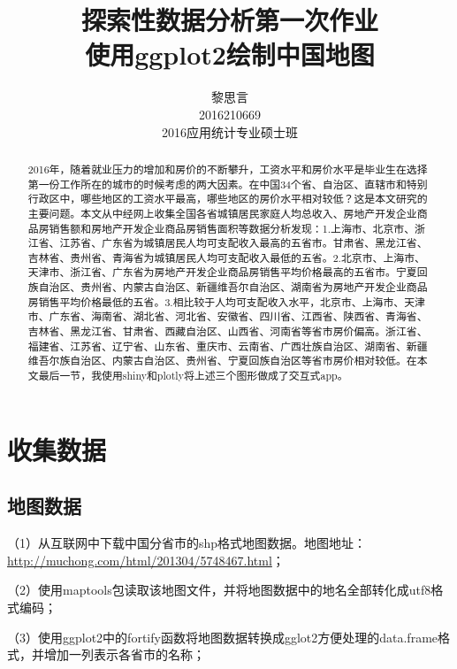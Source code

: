 \documentclass[11pt,a4paper,onecolumn]{article}
\begin{document}
\title{\bfseries 探索性数据分析第一次作业 \\ \Large 使用ggplot2绘制中国地图}
\date{}
\author{黎思言 \\ 2016210669 \\ 2016应用统计专业硕士班}
\maketitle

\begin{abstract}
2016年，随着就业压力的增加和房价的不断攀升，工资水平和房价水平是毕业生在选择第一份工作所在的城市的时候考虑的两大因素。在中国34个省、自治区、直辖市和特别行政区中，哪些地区的工资水平最高，哪些地区的房价水平相对较低？这是本文研究的主要问题。本文从中经网上收集全国各省城镇居民家庭人均总收入、房地产开发企业商品房销售额和房地产开发企业商品房销售面积等数据分析发现：1.上海市、北京市、浙江省、江苏省、广东省为城镇居民人均可支配收入最高的五省市。甘肃省、黑龙江省、吉林省、贵州省、青海省为城镇居民人均可支配收入最低的五省。2.北京市、上海市、天津市、浙江省、广东省为房地产开发企业商品房销售平均价格最高的五省市。宁夏回族自治区、贵州省、内蒙古自治区、新疆维吾尔自治区、湖南省为房地产开发企业商品房销售平均价格最低的五省。3.相比较于人均可支配收入水平，北京市、上海市、天津市、广东省、海南省、湖北省、河北省、安徽省、四川省、江西省、陕西省、青海省、吉林省、黑龙江省、甘肃省、西藏自治区、山西省、河南省等省市房价偏高。浙江省、福建省、江苏省、辽宁省、山东省、重庆市、云南省、广西壮族自治区、湖南省、新疆维吾尔族自治区、内蒙古自治区、贵州省、宁夏回族自治区等省市房价相对较低。在本文最后一节，我使用shiny和plotly将上述三个图形做成了交互式app。
\end{abstract}

\section{收集数据}

\subsection{地图数据}

（1）从互联网中下载中国分省市的shp格式地图数据。地图地址：\url{http://muchong.com/html/201304/5748467.html}；

（2）使用maptools包读取该地图文件，并将地图数据中的地名全部转化成utf8格式编码；

（3）使用ggplot2中的fortify函数将地图数据转换成gglot2方便处理的data.frame格式，并增加一列表示各省市的名称；
\end{document}
